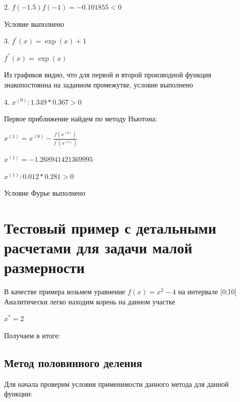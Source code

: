 2.  \begin{math}
	f(-1.5)f(-1)=-0.101855<0 
\end{math}

Условие выполнено

3. \begin{math}
	f^{'}(x)=\exp(x)+1
\end{math}

\begin{math}
	f^{''}(x)=\exp(x)
\end{math}

Из графиков видно, что для первой и второй производной функция знакопостоянна на заданном промежутке, условие выполнено

4. \begin{math}
	x^{(0)}:1.349*0.367>0
\end{math}

Первое приближение найдем по методу Ньютона: 

\begin{math}
	x^{(1)}=x^{(0)}-\frac{f(x^{(0)})}{f^{'}(x^{(0)})}
\end{math}

\begin{math}
	x^{(1)}=-1.268941421369995
\end{math}


\begin{math}
	x^{(1)}:0.012*0.281>0
\end{math}

Условие Фурье выполнено

\section{Тестовый пример с детальными расчетами для задачи малой размерности}

В качестве примера возьмем уравнение 
\begin{math}
	f(x)=x^{2}-4 
\end{math}
на интервале [0;10]
Аналитически легко находим корень на данном участке

\begin{math}
	x^{*}=2
\end{math}

Получаем в итоге: 
\subsection {Метод половинного деления}

Для начала проверим условия применимости данного метода для данной функции: 

